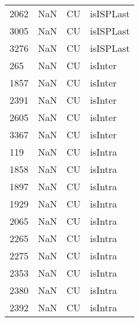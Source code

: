 \begin{tabular}{llll}
2062 &                   NaN &                         CU &                                 isISPLast \\
3005 &                   NaN &                         CU &                                 isISPLast \\
3276 &                   NaN &                         CU &                                 isISPLast \\
265  &                   NaN &                         CU &                                   isInter \\
1857 &                   NaN &                         CU &                                   isInter \\
2391 &                   NaN &                         CU &                                   isInter \\
2605 &                   NaN &                         CU &                                   isInter \\
3367 &                   NaN &                         CU &                                   isInter \\
119  &                   NaN &                         CU &                                   isIntra \\
1858 &                   NaN &                         CU &                                   isIntra \\
1897 &                   NaN &                         CU &                                   isIntra \\
1929 &                   NaN &                         CU &                                   isIntra \\
2065 &                   NaN &                         CU &                                   isIntra \\
2265 &                   NaN &                         CU &                                   isIntra \\
2275 &                   NaN &                         CU &                                   isIntra \\
2353 &                   NaN &                         CU &                                   isIntra \\
2380 &                   NaN &                         CU &                                   isIntra \\
2392 &                   NaN &                         CU &                                   isIntra \\

\end{tabular}
